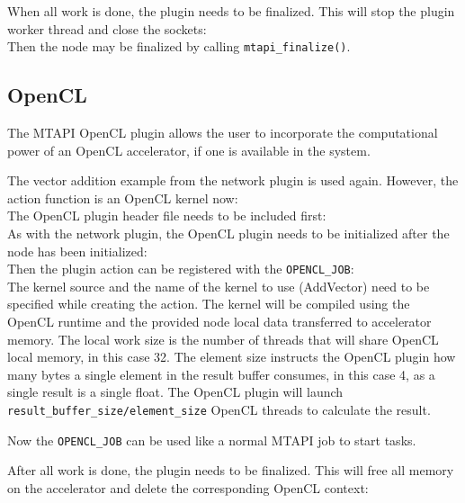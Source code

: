 When all work is done, the plugin needs to be finalized. This will stop the plugin worker thread and close the sockets:
%
\\
%
Then the node may be finalized by calling \lstinline|mtapi_finalize()|.

\subsection{OpenCL}

The MTAPI OpenCL plugin allows the user to incorporate the computational power of an OpenCL accelerator, if one is available in the system.

The vector addition example from the network plugin is used again. However, the action function is an OpenCL kernel now:
%
\\
%
The OpenCL plugin header file needs to be included first:
%
\\
%
As with the network plugin, the OpenCL plugin needs to be initialized after the node has been initialized:
%
\\
%
Then the plugin action can be registered with the \lstinline|OPENCL_JOB|:
%
\\
%
The kernel source and the name of the kernel to use (AddVector) need to be specified while creating the action. The kernel will be compiled using the OpenCL runtime and the provided node local data transferred to accelerator memory. The local work size is the number of threads that will share OpenCL local memory, in this case 32. The element size instructs the OpenCL plugin how many bytes a single element in the result buffer consumes, in this case 4, as a single result is a single float. The OpenCL plugin will launch \lstinline|result_buffer_size/element_size| OpenCL threads to calculate the result.

Now the \lstinline|OPENCL_JOB| can be used like a normal MTAPI job to start tasks.

After all work is done, the plugin needs to be finalized. This will free all memory on the accelerator and delete the corresponding OpenCL context:
%
\\
%
